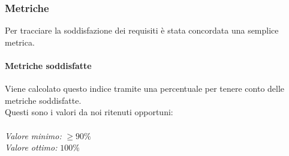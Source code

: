 \subsubsection{Metriche} 
Per tracciare la soddisfazione dei requisiti è stata concordata una semplice metrica.
\paragraph{Metriche soddisfatte}
Viene calcolato questo indice tramite una percentuale per tenere conto delle metriche soddisfatte.\\
Questi sono i valori da noi ritenuti opportuni:\\\\
\textit{Valore minimo:} $ \ge 90\% $\\
\textit{Valore ottimo:} $ 100\% $\\